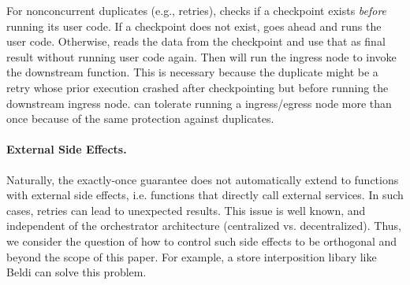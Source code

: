 For nonconcurrent duplicates (e.g., retries), \name{} checks if a checkpoint
exists \emph{before} running its user code. If a checkpoint does not exist,
\name{} goes ahead and runs the user code. Otherwise, \name{} reads the data
from the checkpoint and use that as final result without running user code
again. Then \name{} will run the ingress node to invoke the downstream function.
This is necessary because the duplicate might be a retry whose prior execution
crashed after checkpointing but before running the downstream ingress node. \name{} can
tolerate running a ingress/egress node more than once because of the same protection
against duplicates.

\paragraph{External Side Effects.} Naturally, the
exactly-once guarantee does not automatically extend to functions with external side effects, 
i.e. functions that directly call external services. In such cases, retries can lead 
to unexpected results. This issue is well known, and independent of 
the orchestrator architecture (centralized vs. decentralized). 
Thus, we consider the question of how to control such side effects to be
orthogonal and beyond the scope of this paper.
For example, a store interposition libary like Beldi \cite{beldi} can solve this problem. 